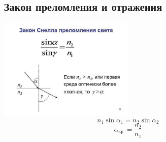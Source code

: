 \subsection*{Закон преломления и отражения}
\includegraphics[width=0.5\textwidth]{parts/img/p1_snel.jpg}
$$n_1 \sin \alpha_1 = n_2 \sin \alpha_2$$
$$\alpha_{кр.} = \frac{n_2}{n_1}$$